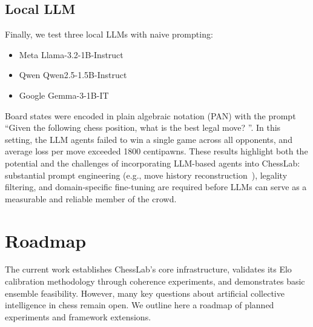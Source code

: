 \documentclass[format=acmsmall, review=false]{acmart}
\begin{document}
\subsection{Local LLM}

Finally, we test three local LLMs with naive prompting:
\begin{itemize}
  \item Meta Llama-3.2-1B-Instruct
  \item Qwen Qwen2.5-1.5B-Instruct
  \item Google Gemma-3-1B-IT
\end{itemize}
Board states were encoded in plain algebraic notation (PAN) with the prompt ``Given the following chess position, what is the best legal move? ''.
In this setting, the LLM agents failed to win a single game across all opponents, and average loss per move exceeded 1800 centipawns.
These results highlight both the potential and the challenges of incorporating LLM-based agents into ChessLab: substantial prompt engineering (e.g., move history reconstruction~\cite{dynomight2024}), legality filtering, and domain-specific fine-tuning are required before LLMs can serve as a measurable and reliable member of the crowd.

\section{Roadmap}\label{sec:roadmap}

The current work establishes ChessLab's core infrastructure, validates its Elo calibration methodology through coherence experiments, and demonstrates basic ensemble feasibility.
However, many key questions about artificial collective intelligence in chess remain open.
We outline here a roadmap of planned experiments and framework extensions.
\end{document}
